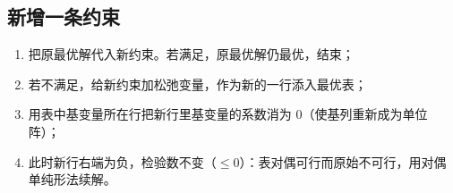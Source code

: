 \subsection{新增一条约束}

\begin{theorembox}
\begin{enumerate}[label=\textbf{第\arabic*步}，,leftmargin=4.2em]
  \item 把原最优解代入新约束。若满足，原最优解仍最优，结束；
  \item 若不满足，给新约束加松弛变量，作为新的一行添入最优表；
  \item 用表中基变量所在行把新行里基变量的系数消为 0（使基列重新成为单位阵）；
  \item 此时新行右端为负，检验数不变（$\le0$）：表对偶可行而原始不可行，用对偶单纯形法续解。
\end{enumerate}
\end{theorembox}

